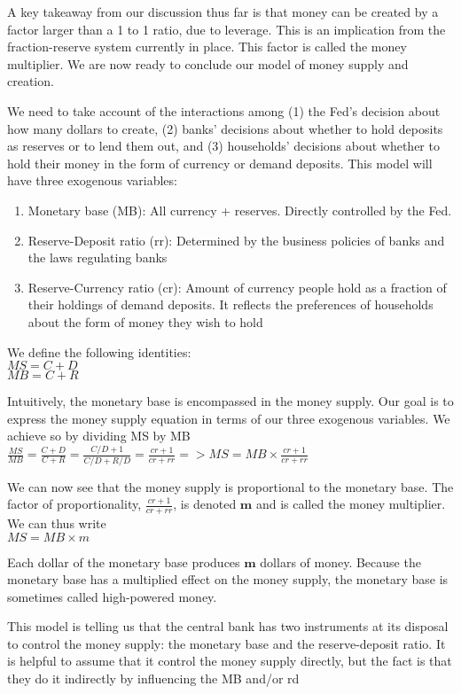 \documentclass[10pt]{article}
\begin{document}
A key takeaway from our discussion thus far is that money can be created by a factor larger than a 1 to 1 ratio, due to leverage. This is an implication from the fraction-reserve system currently in place. This factor is called the money multiplier. We are now ready to conclude our model of money supply and creation.

We need to take account of the interactions among (1) the Fed's decision about how many dollars to create, (2) banks' decisions about whether to hold deposits as reserves or to lend them out, and (3) households' decisions about whether to hold their money in the form of currency or demand deposits. This model will have three exogenous variables:

\begin{enumerate}
  \item Monetary base (MB): All currency + reserves. Directly controlled by the Fed.
  \item Reserve-Deposit ratio (rr): Determined by the business policies of banks and the laws regulating banks
  \item Reserve-Currency ratio (cr): Amount of currency people hold as a fraction of their holdings of demand deposits. It reflects the preferences of households about the form of money they wish to hold
\end{enumerate}

We define the following identities:\\
$M S=C+D$\\
$M B=C+R$

Intuitively, the monetary base is encompassed in the money supply. Our goal is to express the money supply equation in terms of our three exogenous variables. We achieve so by dividing MS by MB\\
$\frac{M S}{M B}=\frac{C+D}{C+R}=\frac{C / D+1}{C / D+R / D}=\frac{c r+1}{c r+r r}=>M S=M B \times \frac{c r+1}{c r+r r}$

We can now see that the money supply is proportional to the monetary base. The factor of proportionality, $\frac{c r+1}{c r+r r}$, is denoted $\mathbf{m}$ and is called the money multiplier. We can thus write\\
$M S=M B \times m$

Each dollar of the monetary base produces $\mathbf{m}$ dollars of money. Because the monetary base has a multiplied effect on the money supply, the monetary base is sometimes called high-powered money.

This model is telling us that the central bank has two instruments at its disposal to control the money supply: the monetary base and the reserve-deposit ratio. It is helpful to assume that it control the money supply directly, but the fact is that they do it indirectly by influencing the MB and/or rd
\end{document}
